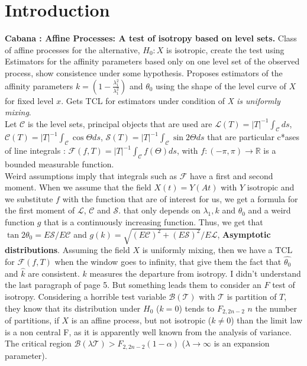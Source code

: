 \documentclass[12pt]{article}
\renewcommand{\hat}{\widehat}
\theoremstyle{Theorem}
\begin{document}
\section{Introduction}
\textbf{Cabana : Affine Processes: A test of isotropy based on level sets.} 
Class of affine processes for the alternative, $H_{0} :X$ is isotropic, create the test using Estimators for the affinity parameters based only on one level set of the observed process, show consistence under some hypothesis. Proposes estimators of the affinity parameters $k = (1 - \frac{\lambda_{1}^{2}}{\lambda_{1}^{2}})$ and $\theta_{0}$ using the shape of the level curve of $X$ for fixed level $x$. Gets TCL for estimators under condition of \textit{X is uniformly mixing}. \\
Let $\mathscr{C}$ is the level sets, principal objects that are used are $\mathscr{L}(T) = |T|^{-1}\int_{\mathscr{C}}ds$, $\mathscr{C}(T) = |T|^{-1}\int_{\mathcal{C}} \cos\Theta ds$, $\mathscr{S}(T) = |T|^{-1}\int_{\mathscr{C}} \sin2\Theta ds$ that are particular c*ases of line integrals : $\mathscr{F}(f, T) = |T|^{-1}\int_{\mathscr{C}}f(\Theta)ds$, with $f:(-\pi, \pi) \to \mathbb{R}$ is a bounded measurable function.\\
Weird assumptions imply that integrals such as $\mathscr{F}$ have a first and second moment. When we assume that the field $X(t) = Y(At)$ with $Y$ isotropic and we substitute $f$ with the function that are of interest for us, we get a formula for the first moment of $\mathscr{L}$, $\mathscr{C}$ and $\mathscr{S}$. that only depends on $\lambda_{1}, k$ and $\theta_{0}$ and a weird function $g$ that is a continuously increasing function. Thus, we get that $\tan 2\theta_{0} = E\mathscr{S}/E\mathscr{C}$ and $g(k) = \sqrt{(E\mathscr{C})^2 + (E\mathscr{S})^2}/E\mathscr{L}$, \textbf{Asymptotic distributions}. Assuming the field $X$ is uniformly mixing, then we have a TCL for $\mathscr{F}(f, T)$ when the window goes to infinity, that give them the fact that $\hat{\theta_{0}}$ and $\hat{k}$ are consistent. $k$ measures the departure from isotropy. I didn't understand the last paragraph of page 5. But something leads them to consider an $F$ test of isotropy. Considering a horrible test variable $\mathscr{B}(\mathscr{T})$ with $\mathscr{T}$ is partition of $T$, they know that its distribution under $H_{0}$ ($k = 0$) tends to $F_{2, 2n-2}$ $n$ the number of partitions, if $X$ is an affine process, but not isotropic ($k \neq 0$) than the limit law is a non central F, as it is apparently well known from the analysis of variance. The critical region $\mathscr{B}(\lambda \mathscr{T}) > F_{2, 2n-2}(1-\alpha)$ ($\lambda \to \infty$ is an expansion parameter). \\
\end{document}
